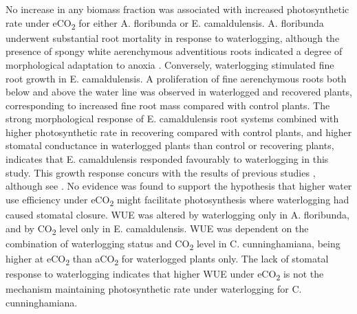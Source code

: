 \documentclass[12pt,a4paper]{memoir}
\begin{document}
No increase in any biomass fraction was associated with increased photosynthetic rate under eCO\textsubscript{2} for either A. floribunda or E. camaldulensis. A. floribunda underwent substantial root mortality in response to waterlogging, although the presence of spongy white aerenchymous adventitious roots indicated a degree of morphological adaptation to anoxia \citep{Evans2004}. Conversely, waterlogging stimulated fine root growth in E. camaldulensis. A proliferation of fine aerenchymous roots both below and above the water line was observed in waterlogged and recovered plants, corresponding to increased fine root mass compared with control plants. The strong morphological response of E. camaldulensis root systems combined with higher photosynthetic rate in recovering compared with control plants, and higher stomatal conductance in waterlogged plants than control or recovering plants, indicates that E. camaldulensis responded favourably to waterlogging in this study. This growth response concurs with the results of previous studies \citep{Sena-Gomes1980, Marcar1993}, although see \citep{Kogawara2006}. No evidence was found to support the hypothesis that higher water use efficiency under eCO\textsubscript{2} might facilitate photosynthesis where waterlogging had caused stomatal closure. WUE was altered by waterlogging only in A. floribunda, and by CO\textsubscript{2} level only in E. camaldulensis. WUE was dependent on the combination of waterlogging status and CO\textsubscript{2} level in C. cunninghamiana, being higher at eCO\textsubscript{2} than aCO\textsubscript{2} for waterlogged plants only. The lack of stomatal response to waterlogging indicates that higher WUE under eCO\textsubscript{2} is not the mechanism maintaining photosynthetic rate under waterlogging for C. cunninghamiana. 
\end{document}
